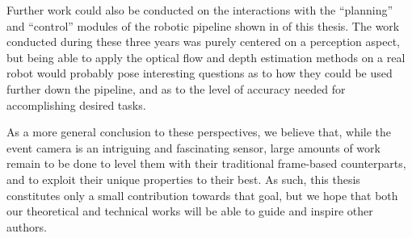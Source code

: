 Further work could also be conducted on the interactions with the ``planning'' and ``control'' modules of the robotic pipeline shown in  of this thesis. The work conducted during these three years was purely centered on a perception aspect, but being able to apply the optical flow and depth estimation methods on a real robot would probably pose interesting questions as to how they could be used further down the pipeline, and as to the level of accuracy needed for accomplishing desired tasks.

As a more general conclusion to these perspectives, we believe that, while the event camera is an intriguing and fascinating sensor, large amounts of work remain to be done to level them with their traditional frame-based counterparts, and to exploit their unique properties to their best. As such, this thesis constitutes only a small contribution towards that goal, but we hope that both our theoretical and technical works will be able to guide and inspire other authors.
